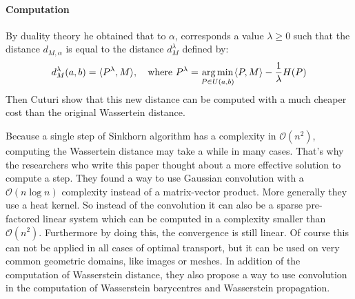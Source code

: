 \paragraph{Computation}
By duality theory he obtained that to $\alpha$, corresponds a value $\lambda \geqslant 0$ such that the distance $d_{M, \alpha}$ is equal to the distance $d_M^\lambda$ defined by:
$$ d_M^\lambda(a, b) = \langle P^\lambda, M \rangle, \quad \text{where } P^\lambda = \operatorname*{arg\,min}_{P \in U(a, b)} \langle P, M \rangle - \dfrac{1}{\lambda} H(P) $$
Then Cuturi show that this new distance can be computed with a much cheaper cost than the original Wassertein distance.


\cite{Arj++}


Because a single step of Sinkhorn algorithm has a complexity in $\mathcal{O}(n^2)$, computing the Wassertein distance may take a while in many cases. That's why the researchers who write this paper thought about a more effective solution to compute a step. They found a way to use Gaussian convolution with a $\mathcal{O}(n \log n)$ complexity instead of a matrix-vector product. More generally they use a heat kernel. So instead of the convolution it can also be a sparse pre-factored linear system which can be computed in a complexity smaller than $\mathcal{O}(n^2)$. Furthermore by doing this, the convergence is still linear. Of course this can not be applied in all cases of optimal transport, but it can be used on very common geometric domains, like images or meshes. In addition of the computation of Wasserstein distance, they also propose a way to use convolution in the computation of Wasserstein barycentres and Wasserstein propagation.


